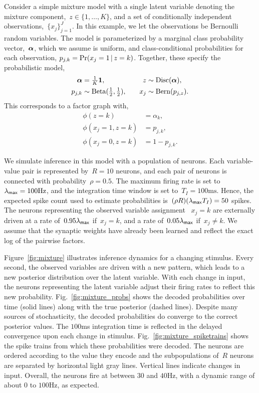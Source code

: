 Consider a simple mixture model with a single
latent variable denoting the mixture component,~${z \in \{1, \ldots, K\}}$,
and a set of conditionally independent observations,~$\{x_j\}_{j=1}^J$.
In this example, we let the observations be Bernoulli
random variables. The model is parameterized by a marginal
class probability vector,~$\boldsymbol{\alpha}$, which we assume is uniform,
and class-conditional probabilities for each observation,
${p_{j,k} = \Pr(x_j=1 \,|\, z=k)}$. Together, these
specify the probabilistic model,
\begin{align*}
  \boldsymbol{\alpha} &= \tfrac{1}{K} \boldsymbol{1}, & & &
  z &\sim \mathrm{Disc}(\boldsymbol{\alpha}), \\
  p_{j,k} &\sim \mathrm{Beta}(\tfrac{1}{2},\tfrac{1}{2}),  & & &
  x_j &\sim \mathrm{Bern}(p_{j,z}).  
\end{align*}
This corresponds to a factor graph with,
\begin{align*}
  \phi(z=k) &= \alpha_k, \\
  \phi(x_j=1, z=k) &= p_{j,k}, \\
  \phi(x_j=0, z=k) &= 1-p_{j,k}.
\end{align*}

We simulate inference in this model with a population of neurons.
Each variable-value pair is represented by~$R=10$ neurons, and each
pair of neurons is connected with probability~$\rho=0.5$. The maximum
firing rate is set to~$\lambda_{\mathsf{max}}=100\text{Hz}$, and the integration
time window is set to~$T_I=100\text{ms}$. Hence, the expected spike
count used to estimate probabilities is~$(\rho R)(\lambda_{\mathsf{max}} T_I)
= 50$ spikes. The neurons representing the observed variable assignment
~$x_j=k$ are externally driven at a rate of~$0.95 \lambda_{\mathsf{max}}$ if~$x_j=k$,
and a rate of~$0.05 \lambda_{\mathsf{max}}$ if~$x_j \neq k$. We assume that the
synaptic weights have already been learned and reflect the exact
log of the pairwise factors. 

Figure~\ref{fig:mixture} illustrates inference dynamics for a
changing stimulus. Every second, the observed variables are driven with
a new pattern, which leads to a new posterior distribution over the
latent variable. With each change in input, the neurons representing the
latent variable adjust their firing rates to reflect this new probability.
Fig.~\ref{fig:mixture_probs} shows the decoded probabilities over time
(solid lines) along with the true posterior (dashed lines). Despite many
sources of stochasticity, the decoded probabilities do converge to
the correct posterior values. The $100$ms integration time is reflected in
the delayed convergence upon each change in stimulus.
Fig.~\ref{fig:mixture_spiketrains} shows the spike trains from which these
probabilities were decoded. The neurons are ordered according to
the value they encode and the subpopulations of~$R$ neurons are
separated by horizontal light gray lines. Vertical lines indicate changes
in input. Overall, the neurons fire at between $30$ and $40$Hz, with a
dynamic range of about $0$ to $100$Hz, as expected.



